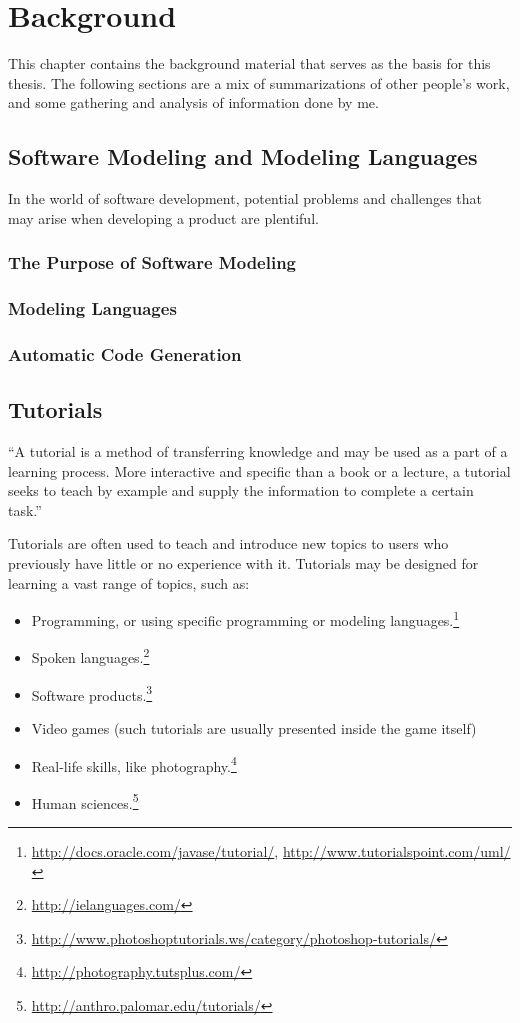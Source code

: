 \chapter{Background}
\label{ch:background}
This chapter contains the background material that serves as the basis for this thesis. The following sections are a mix of summarizations of other people's work, and some gathering and analysis of information done by me.


\section{Software Modeling and Modeling Languages}
\label{sec:software_modeling}
In the world of software development, potential problems and challenges that may arise when developing a product are plentiful.


\subsection{The Purpose of Software Modeling}


\subsection{Modeling Languages}


\subsection{Automatic Code Generation}


\section{Tutorials}
\label{sec:tutorials}
``A tutorial is a method of transferring knowledge and may be used as a part of a learning process. More interactive and specific than a book or a lecture, a tutorial seeks to teach by example and supply the information to complete a certain task.''~\cite{wiki:tutorial}

\noindent
Tutorials are often used to teach and introduce new topics to users who previously have little or no experience with it. Tutorials may be designed for learning a vast range of topics, such as:
\begin{itemize}
	\item Programming, or using specific programming or modeling languages.\footnote{\url{http://docs.oracle.com/javase/tutorial/}, \url{http://www.tutorialspoint.com/uml/}}
	\item Spoken languages.\footnote{\url{http://ielanguages.com/}}
	\item Software products.\footnote{\url{http://www.photoshoptutorials.ws/category/photoshop-tutorials/}}
	\item Video games (such tutorials are usually presented inside the game itself)
	\item Real-life skills, like photography.\footnote{\url{http://photography.tutsplus.com/}}
	\item Human sciences.\footnote{\url{http://anthro.palomar.edu/tutorials/}}
\end{itemize}

